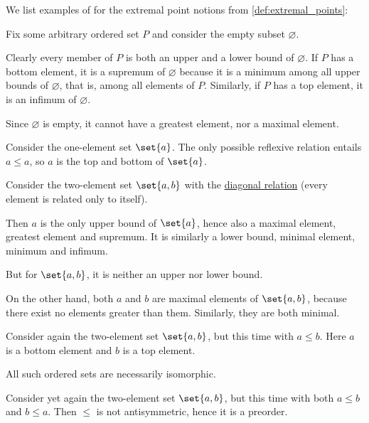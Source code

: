 \begin{example}\label{ex:thm:def:extremal_points}
  We list examples of for the extremal point notions from \cref{def:extremal_points}:
  \begin{thmenum}
     Fix some arbitrary ordered set \( P \) and consider the empty subset \( \varnothing \).

    Clearly every member of \( P \) is both an upper and a lower bound of \( \varnothing \). If \( P \) has a bottom element, it is a supremum of \( \varnothing \) because it is a minimum among all upper bounds of \( \varnothing \), that is, among all elements of \( P \). Similarly, if \( P \) has a top element, it is an infimum of \( \varnothing \).

    Since \( \varnothing \) is empty, it cannot have a greatest element, nor a maximal element.

     Consider the one-element set \( \set{ a } \). The only possible reflexive relation entails \( a \leq a \), so \( a \) is the top and bottom of \( \set{ a } \).

     Consider the two-element set \( \set{ a, b } \) with the \hyperref[def:binary_relation/diagonal]{diagonal relation} (every element is related only to itself).

    Then \( a \) is the only upper bound of \( \set{ a } \), hence also a maximal element, greatest element and supremum. It is similarly a lower bound, minimal element, minimum and infimum.

    But for \( \set{ a, b } \), it is neither an upper nor lower bound.

    On the other hand, both \( a \) and \( b \) are maximal elements of \( \set{ a, b } \), because there exist no elements greater than them. Similarly, they are both minimal.

     Consider again the two-element set \( \set{ a, b } \), but this time with \( a \leq b \). Here \( a \) is a bottom element and \( b \) is a top element.

    All such ordered sets are necessarily isomorphic.

     Consider yet again the two-element set \( \set{ a, b } \), but this time with both \( a \leq b \) and \( b \leq a \). Then \( {\leq} \) is not antisymmetric, hence it is a preorder.


\end{thmenum}
\end{example}
